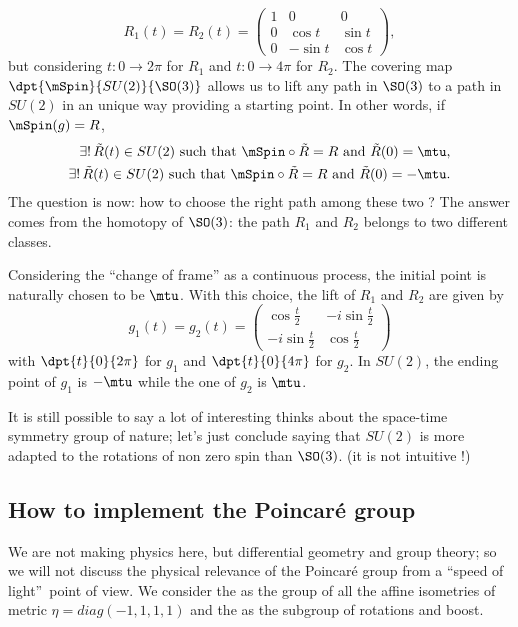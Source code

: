 \[
  R_1(t)=R_2(t)=
\begin{pmatrix}
1&0&0\\
0&\cos t&\sin t\\
0&-\sin t&\cos t
\end{pmatrix},
\]
but considering $t\colon 0\to 2\pi$ for $R_1$ and $t\colon 0\to 4\pi$ for $R_2$. The covering map $\dpt{\mSpin}{SU(2)}{\SO(3)}$ allows us to lift any path in $\SO(3)$ to a path in $SU(2)$ in an unique way providing a starting point. In other words, if $\mSpin(g)=R$,
\[
\begin{split}
  \exists !\, \tilde{R}(t)\in SU(2)\text{ such that }\mSpin\circ\tilde{R}=R \text{ and } \tilde{R}(0)=\mtu,\\
  \exists !\, \tilde{R}(t)\in SU(2)\text{ such that }\mSpin\circ\tilde{R}=R \text{ and } \tilde{R}(0)=-\mtu.
\end{split}
\]
The question is now: how to choose the right path among these two ? The answer comes from the homotopy of $\SO(3)$: the path $R_1$ and $R_2$ belongs to two different classes.

Considering the ``change of frame''{} as a continuous process, the initial point is naturally chosen to be $\mtu$. With this choice, the lift of $R_1$ and $R_2$ are given by
\[
  g_1(t)=g_2(t)=
\begin{pmatrix}
\cos\frac{t}{2}&-i\sin\frac{t}{2}\\
-i\sin\frac{t}{2}&\cos \frac{t}{2}
\end{pmatrix}
\]
with $\dpt{t}{0}{2\pi}$ for $g_1$ and $\dpt{t}{0}{4\pi}$ for $g_2$. In $SU(2)$, the ending point of $g_1$ is $-\mtu$ while the one of $g_2$ is $\mtu$.

It is still possible to say a lot of interesting thinks about the space-time symmetry group of nature; let's just conclude saying that $SU(2)$ is more adapted to the rotations of non zero spin than $\SO(3)$. (it is  not intuitive !)
\subsection{How to implement the Poincaré group}
\label{pg:poincare_act}

We are not making physics here, but differential geometry and group theory; so we will not discuss the physical relevance of the Poincaré group from a ``speed of light''\ point of view. We consider the  as the group of all the affine isometries of metric $\eta=diag(-1,1,1,1)$ and the  as the subgroup of rotations and boost.

